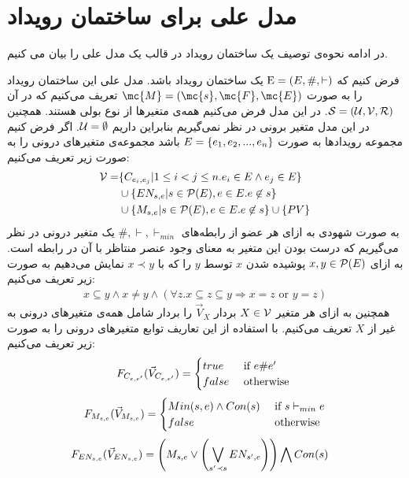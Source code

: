 \section{مدل علی برای ساختمان رویداد}
در ادامه نحوه‌ی توصیف یک ساختمان رویداد در قالب یک مدل علی را بیان می کنیم.

فرض کنیم که
$\mathrm{E} = (E,\#,\vdash)$
یک ساختمان رویداد باشد.
مدل علی این ساختمان رویداد را به صورت
$\mc{M} = (\mc{s},\mc{F},\mc{E})$
تعریف می‌کنیم که در آن
$\mathcal{S} = (\mathcal{U},\mathcal{V},\mathcal{R})$.
در این مدل فرض می‌کنیم همه‌ی متغیر‌ها از نوع بولی هستند.
همچنین در این مدل متغیر برونی در نظر نمی‌گیریم بنابراین داریم
$\mathcal{U} = \emptyset$.
اگر فرض کنیم مجموعه‌ رویدادها به صورت
$E = \{e_1,e_2,...,e_n\}$
باشد مجموعه‌ی متغیر‌های درونی را به صورت زیر تعریف می‌کنیم:
\begin{align*}
    \mathcal{V} = & \{C_{e_i,e_j} |  1 \leq i < j \leq n.
    e_i \in E \wedge e_j \in E\}                              \\
                  & \cup \{EN_{s,e} | s \in \mathcal{P}(E),
    e \in E. e \not \in s \}                                  \\
                  & \cup \{M_{s,e} | s \in \mathcal{P}(E),
        e \in E. e \not \in s \} \cup \{PV\}
\end{align*}
به صورت شهودی به ازای هر عضو از رابطه‌های
$\#,\vdash,\vdash_{min}$
یک متغیر درونی در نظر می‌گیریم که درست بودن این متغیر به معنای وجود عنصر منتاظر با آن در رابطه است.
به ازای
$x,y \in \mathcal{P}(E)$
پوشیده
شدن 
$x$
توسط
$y$
را که با 
$x \prec y$
نمایش می‌دهیم به صورت زیر تعریف می‌کنیم:
\begin{align*}
    x \subseteq y \wedge x \neq y \wedge
    (\forall z. x \subseteq z \subseteq y \Rightarrow x = z
    \text{ or } y = z)
\end{align*}
همچنین به ازای هر متغیر 
$X \in \mathcal{V}$
بردار
$\vec V_X$
را بردار شامل همه‌ی متغیر‌های درونی به غیر از 
$X$
تعریف می‌کنیم.
با استفاده از این تعاریف 
توابع متغیر‌های درونی را به صورت زیر تعریف می‌کنیم:
$$
    F_{C_{e,e'}}(\vec V_{C_{e,e'}}) = \begin{cases}
        true  & \text{ if } e \# e'\\
        false & \text{ otherwise }
    \end{cases}
$$
$$
    F_{M_{s,e}}(\vec V_{M_{s,e}}) = \begin{cases}
        Min(s,e) \wedge Con(s) & \text{ if } s \vdash_{min} e \\
        false                  & \text{ otherwise }
    \end{cases}
$$
\begin{align*}
    F_{EN_{s,e}}(\vec V_{EN_{s,e}}) & =
    \left(
    M_{s,e} \vee
    \left(
    \bigvee_{s'\prec s}EN_{s',e}
    \right)
    \right)
    \bigwedge
    Con(s)
\end{align*}
